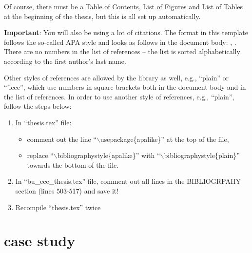 
Of course, there must be a Table of Contents, List of Figures and List of Tables at the beginning of the thesis, but this is all set up automatically.

{\bf Important}: You will also be using a lot of citations. The format in this template follows the so-called APA style and looks as follows in the document body: \cite{lamport1985:latex}, \cite{Debr01}. There are no numbers in the list of references -- the list is sorted alphabetically according to the first author's last name.

Other styles of references are allowed by the library as well, e.g., ``plain'' or ``'ieee'', which use numbers in square brackets both in the document body and in the list of references. In order to use another style of references, e.g., ``plain'', follow the steps below:
%
\begin{enumerate}
	\item In ``thesis.tex'' file:
	\begin{itemize}
		\item comment out the line ``$\backslash$usepackage\{apalike\}'' at the top of the file,
		\item replace ``$\backslash$bibliographystyle\{apalike\}'' with ``$\backslash$bibliographystyle\{plain\}'' towards the bottom of the file.
	\end{itemize}
	\item In ``bu\_ece\_thesis.tex'' file, comment out all lines in the BIBLIOGRPAHY section (lines 503-517) and save it!
	\item Recompile ``thesis.tex'' twice
\end{enumerate}



\section{case study}

